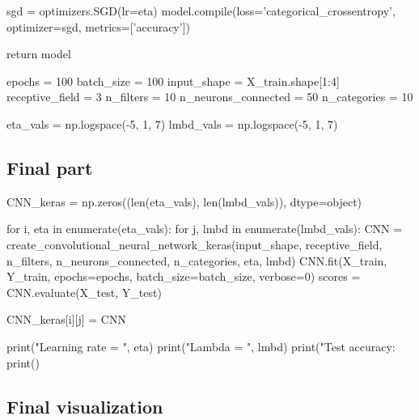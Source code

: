 \documentclass[%
oneside,                 %
final,                   %
10pt]{article}
\begin{document}
    sgd = optimizers.SGD(lr=eta)
    model.compile(loss='categorical_crossentropy', optimizer=sgd, metrics=['accuracy'])
    
    return model

epochs = 100
batch_size = 100
input_shape = X_train.shape[1:4]
receptive_field = 3
n_filters = 10
n_neurons_connected = 50
n_categories = 10

eta_vals = np.logspace(-5, 1, 7)
lmbd_vals = np.logspace(-5, 1, 7)

\epycod


\subsection{Final part}


















\bpycod
CNN_keras = np.zeros((len(eta_vals), len(lmbd_vals)), dtype=object)
        
for i, eta in enumerate(eta_vals):
    for j, lmbd in enumerate(lmbd_vals):
        CNN = create_convolutional_neural_network_keras(input_shape, receptive_field,
                                              n_filters, n_neurons_connected, n_categories,
                                              eta, lmbd)
        CNN.fit(X_train, Y_train, epochs=epochs, batch_size=batch_size, verbose=0)
        scores = CNN.evaluate(X_test, Y_test)
        
        CNN_keras[i][j] = CNN
        
        print("Learning rate = ", eta)
        print("Lambda = ", lmbd)
        print("Test accuracy: %
        print()

\epycod


\subsection{Final visualization}
\end{document}
